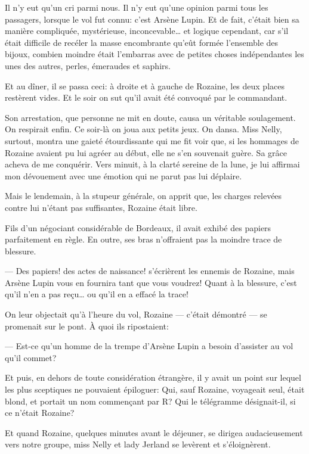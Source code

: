 \documentclass[12pt,a4paper]{book}
\begin{document}
Il n’y eut qu’un cri parmi nous. Il n’y eut qu’une opinion parmi tous les passagers, lorsque le vol fut connu: c’est Arsène Lupin. Et de fait, c’était bien sa manière compliquée, mystérieuse, inconcevable… et logique cependant, car s’il était difficile de recéler la masse encombrante qu’eût formée l’ensemble des bijoux, combien moindre était l’embarras avec de petites choses indépendantes les unes des autres, perles, émeraudes et saphirs.

Et au dîner, il se passa ceci: à droite et à gauche de Rozaine, les deux places restèrent vides. Et le soir on sut qu’il avait été convoqué par le commandant.

Son arrestation, que personne ne mit en doute, causa un véritable soulagement. On respirait enfin. Ce soir-là on joua aux petits jeux. On dansa. Miss Nelly, surtout, montra une gaieté étourdissante qui me fit voir que, si les hommages de Rozaine avaient pu lui agréer au début, elle ne s’en souvenait guère. Sa grâce acheva de me conquérir. Vers minuit, à la clarté sereine de la lune, je lui affirmai mon dévouement avec une émotion qui ne parut pas lui déplaire.

Mais le lendemain, à la stupeur générale, on apprit que, les charges relevées contre lui n’étant pas suffisantes, Rozaine était libre.

Fils d’un négociant considérable de Bordeaux, il avait exhibé des papiers parfaitement en règle. En outre, ses bras n’offraient pas la moindre trace de blessure.

— Des papiers! des actes de naissance! s’écrièrent les ennemis de Rozaine, mais Arsène Lupin vous en fournira tant que vous voudrez! Quant à la blessure, c’est qu’il n’en a pas reçu… ou qu’il en a effacé la trace!

On leur objectait qu’à l’heure du vol, Rozaine — c’était démontré — se promenait sur le pont. À quoi ils ripostaient:

— Est-ce qu’un homme de la trempe d’Arsène Lupin a besoin d’assister au vol qu’il commet?

Et puis, en dehors de toute considération étrangère, il y avait un point sur lequel les plus sceptiques ne pouvaient épiloguer: Qui, sauf Rozaine, voyageait seul, était blond, et portait un nom commençant par R? Qui le télégramme désignait-il, si ce n’était Rozaine?

Et quand Rozaine, quelques minutes avant le déjeuner, se dirigea audacieusement vers notre groupe, miss Nelly et lady Jerland se levèrent et s’éloignèrent.
\end{document}
